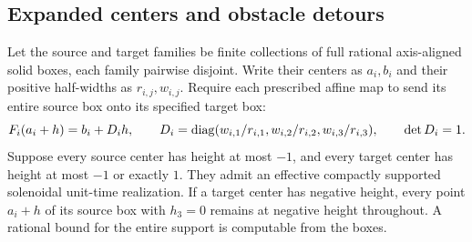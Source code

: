 \subsection{Expanded centers and obstacle detours}\label{bc:expanded-height-section}
\begin{proposition}
\label{bc:expanded-height-routing}
Let the source and target families be finite collections of full rational
axis-aligned solid boxes, each family pairwise disjoint. Write their centers
as $a_i,b_i$ and their positive half-widths as $r_{i,j},w_{i,j}$.
Require each prescribed affine map to send its entire source box onto
its specified target box:
\[
 F_i(a_i+h)=b_i+D_i h,\qquad
 D_i=\operatorname{diag}(w_{i,1}/r_{i,1},w_{i,2}/r_{i,2},w_{i,3}/r_{i,3}),
 \qquad \det D_i=1.
\]
Suppose every source center has height at most $-1$, and every target
center has height at most $-1$ or exactly $1$. They admit an effective
compactly supported solenoidal unit-time realization. If a target center
has negative height, every point $a_i+h$ of its source box with $h_3=0$
remains at negative height throughout. A rational bound for the
entire support is computable from the boxes.
\end{proposition}
